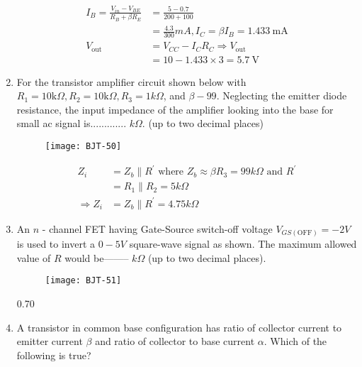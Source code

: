 \begin{enumerate}
\begin{answer}
\begin{align*}
I_{B}=\frac{V_{i n}-V_{B E}}{R_{B}+\beta R_{E}}&=\frac{5-0.7}{200+100}\\&=\frac{4.3}{300} m A, I_{C}=\beta I_{B}=1.433 \mathrm{~mA}\\
V_{\text {out }}&=V_{C C}-I_{C} R_{C} \Rightarrow V_{\text {out }}\\&=10-1.433 \times 3=5.7 \mathrm{~V}
\end{align*}
\end{answer}
	\item For the transistor amplifier circuit shown below with $R_{1}=10 \mathrm{k} \Omega, R_{2}=10 \mathrm{k} \Omega, R_{3}=1 k \Omega$, and $\beta-99$. Neglecting the emitter diode resistance, the input impedance of the amplifier looking into the base for small ac signal is............. $k \Omega$. (up to two decimal places)
{	}
\begin{figure}[H]
\centering
\texttt{[image: BJT-50]}
\end{figure}
\begin{answer}
\begin{align*}
Z_{i}&=Z_{b} \| R^{\prime}\text{ where }Z_{b} \approx \beta R_{3}=99 k \Omega\text{ and } R^{\prime}\\&=R_{1} \| R_{2}=5 k \Omega\\
\Rightarrow Z_{i}&=Z_{b} \| R^{\prime}=4.75 k \Omega
\end{align*}
\end{answer}
\item An $n$ - channel FET having Gate-Source switch-off voltage $V_{G S(\mathrm{OFF})}=-2 V$ is used to invert a $0-5 V$ square-wave signal as shown. The maximum allowed value of $R$ would be-------- $k \Omega$ (up to two decimal places).
{}
\begin{figure}[H]
\centering
\texttt{[image: BJT-51]}
\end{figure}
\begin{answer}
0.70
\end{answer}
\item A transistor in common base configuration has ratio of collector current to emitter current $\beta$ and ratio of collector to base current $\alpha .$ Which of the following is true?
{}


\end{enumerate}
